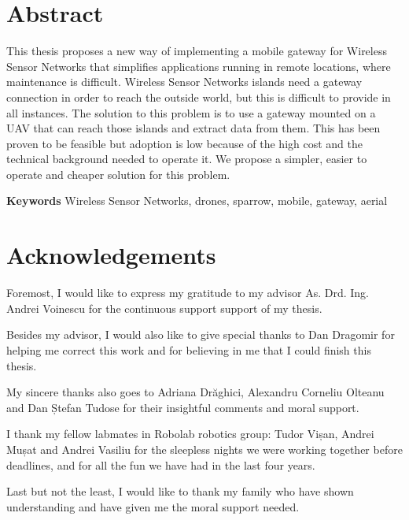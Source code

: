 \chapter*{Abstract}

This thesis proposes a new way of implementing a mobile gateway for Wireless Sensor Networks that simplifies applications running in remote locations, where maintenance is difficult. Wireless Sensor Networks islands need a gateway connection in order to reach the outside world, but this is difficult to provide in all instances.  The solution to this problem is to use a gateway mounted on a UAV that can reach those islands and extract data from them. This has been proven to be feasible but adoption is low because of the high cost and the technical background needed to operate it. We propose a simpler, easier to operate and cheaper solution for this problem.


 

\textbf{Keywords} Wireless Sensor Networks, drones, sparrow, mobile, gateway, aerial

\chapter*{Acknowledgements}

Foremost, I would like to express my gratitude to my advisor As. Drd. Ing. Andrei Voinescu for the continuous support support of my thesis.

Besides my advisor, I would also like to give special thanks to Dan Dragomir for helping me correct this work and for believing in me that I could finish this thesis. 
  
My sincere thanks also goes to Adriana Drăghici, Alexandru Corneliu Olteanu and Dan Ștefan Tudose for their insightful comments  and moral support.

I thank my fellow labmates in Robolab robotics group: Tudor Vișan, Andrei Mușat and Andrei Vasiliu for the sleepless nights we were working together before deadlines, and for all the fun we have had in the last four years.

Last but not the least, I would like to thank my family who have shown understanding and have given me the moral support needed.

